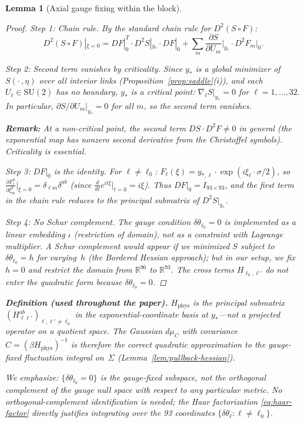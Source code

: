 \documentclass[11pt]{article}
\newtheorem{lemma}[theorem]{Lemma}
\theoremstyle{definition}
\newcommand{\SU}{\mathrm{SU}}
\newcommand{\R}{\mathbb{R}}
\begin{document}
\begin{lemma}[Axial gauge fixing within the block]
\begin{proof}
\emph{Step 1: Chain rule.}
By the standard chain rule for $D^2(S\circ F)$:
\[
D^2(S\circ F)|_{\xi=0}
=DF|_0^T\cdot D^2 S|_{y_*}\cdot DF|_0
+\sum_m\frac{\partial S}{\partial U_m}\bigg|_{y_*}
\cdot D^2 F_m|_0.
\]

\emph{Step 2: Second term vanishes by criticality.}
Since $y_*$ is a global minimizer of $S(\cdot\,,\eta)$ over
all interior links (Proposition~\ref{prop:saddle}(i)), and
each $U_\ell\in\SU(2)$ has no boundary, $y_*$ is a critical
point: $\nabla_\ell S|_{y_*}=0$ for $\ell=1,\ldots,32$.
In particular, $\partial S/\partial U_m|_{y_*}=0$ for all
$m$, so the second term vanishes.

\textbf{Remark:} At a non-critical point, the second term
$DS\cdot D^2 F\ne 0$ in general (the exponential map has
nonzero second derivative from the Christoffel symbols).
Criticality is essential.

\emph{Step 3: $DF|_0$ is the identity.}
For $\ell\ne\ell_0$:
$F_\ell(\xi)=y_{*,\ell}\cdot\exp(i\xi_\ell\cdot\sigma/2)$,
so $\frac{\partial F_\ell^a}{\partial\xi_m^b}\big|_{\xi=0}
=\delta_{\ell m}\delta^{ab}$
(since $\frac{d}{dt}e^{it\xi}|_{t=0}=i\xi$).
Thus $DF|_0=I_{93\times 93}$, and the first term in the
chain rule reduces to the principal submatrix of $D^2 S|_{y_*}$.

\emph{Step 4: No Schur complement.}
The gauge condition
$\delta\theta_{\ell_0}=0$ is implemented as a \emph{linear
embedding} $\iota$ (restriction of domain), not as a constraint with
Lagrange multiplier.
A Schur complement would appear if we minimized $S$ subject
to $\delta\theta_{\ell_0}=h$ for varying~$h$ (the Bordered
Hessian approach); but in our setup, we fix $h=0$ and
restrict the domain from $\R^{96}$ to $\R^{93}$.
The cross terms $H_{\ell_0,\ell'}$ do not enter the
quadratic form because $\delta\theta_{\ell_0}=0$.
\end{proof}

\textbf{Definition (used throughout the paper).}
$H_{\mathrm{phys}}$ is the principal
submatrix $(H_{\ell\ell'}^{ab})_{\ell,\ell'\ne\ell_0}$
in the exponential-coordinate basis at $y_*$---not a projected
operator on a quotient space.
The Gaussian $d\mu_C$ with covariance $C=(\beta H_{\mathrm{phys}})^{-1}$
is therefore the correct quadratic approximation to the gauge-fixed
fluctuation integral on~$\Sigma$
(Lemma~\ref{lem:pullback-hessian}).

We emphasize: $\{\delta\theta_{\ell_0}=0\}$ is the
\emph{gauge-fixed} subspace, not the orthogonal complement of the
gauge null space with respect to any particular metric.  No
orthogonal-complement identification is needed; the Haar factorization
\eqref{eq:haar-factor} directly justifies integrating over the 93
coordinates $\{\delta\theta_\ell:\ell\ne\ell_0\}$.


\end{lemma}
\end{document}
